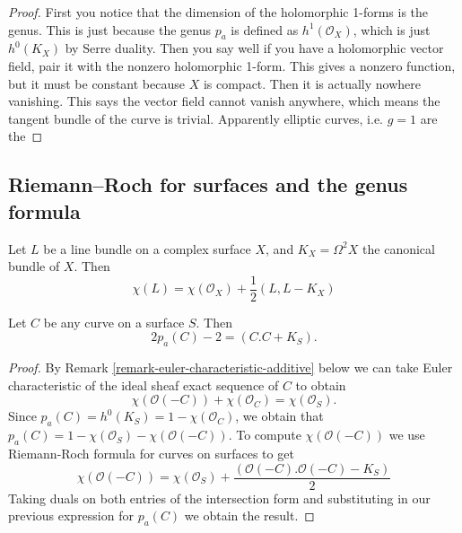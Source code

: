\begin{proof}
First you notice that the dimension of the
holomorphic 1-forms is the genus.
This is just because the genus $p_a$ is
defined as $h^1(\mathcal{O}_X)$, which
is just $h^0(K_X)$ by Serre duality. Then you
say well if you have a holomorphic
vector field, pair it with the nonzero
holomorphic 1-form. This gives a nonzero
function, but it must be constant because $X$
is compact. Then it is actually
nowhere vanishing. This says the vector field
cannot vanish anywhere, which
means the tangent bundle of the curve is
trivial. Apparently elliptic curves,
i.e. $g=1$ are the
\end{proof}

\subsection{Riemann--Roch for surfaces and
the genus
formula}
\label{subsection-riemann-roch-surfaces}

\begin{theorem}
\label{theorem-riema-roch-line-bundl-surfa}
Let $L$ be a line bundle on a complex surface
$X$, and $K_X=\Omega^2X$ the
canonical bundle of $X$. Then
\begin{equation}
\label{equation-riema-roch-line-bundl-surf}
\chi(L)=\chi(\mathcal{O}_X)+\frac{1}{2}(L,L-
K_X)
\end{equation}
\end{theorem}

\begin{lemma}
\label{lemma-genus-formula}
Let $C$ be any curve on a surface $S$. Then
\begin{equation}
\label{equation-genus-formula}
2p_a(C)-2=(C.C+K_S).
\end{equation}
\end{lemma}

\begin{proof}
By Remark
\ref{remark-euler-characteristic-additive}
below we can take Euler characteristic
of the ideal sheaf exact sequence of $C$
to obtain
$$
\chi(\mathcal{O}(-C))+\chi(\mathcal{O}_C)=
\chi(\mathcal{O}_S).
$$
Since $p_a(C)=h^0(K_S)
=1-\chi(\mathcal{O}_C)$, we
obtain that
$p_a(C)=1-\chi(\mathcal{O}_S)-
\chi(\mathcal{O}(-C))$.
To compute $\chi(\mathcal{O}(-C))$ we use
Riemann-Roch formula for curves on surfaces
to get
$$
\chi(\mathcal{O}(-C))=\chi(\mathcal{O}_S)
+\frac{(\mathcal{O}(-C).
\mathcal{O}(-C)-K_S)}{2}
$$
Taking duals on both entries of the
intersection form and substituting in our
previous expression for $p_a(C)$ we obtain
the result.
\end{proof}

